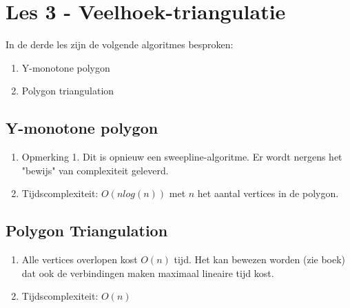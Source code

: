 \documentclass[12pt,a4paper]{article}
\begin{document}
	\section{Les 3 - Veelhoek-triangulatie}    
		In de derde les zijn de volgende algoritmes besproken:
		\begin{enumerate}
			\item Y-monotone polygon
			\item Polygon triangulation
		\end{enumerate}                
	
		\subsection{Y-monotone polygon}
			\begin{enumerate}
				\item Opmerking 1. Dit is opnieuw een sweepline-algoritme. Er wordt nergens het "bewijs" van complexiteit geleverd.
				\item Tijdscomplexiteit: $O(n log (n))$ met $n$ het aantal vertices in de polygon. 
			\end{enumerate}
		
		\subsection{Polygon Triangulation}
			\begin{enumerate}
				\item Alle vertices overlopen kost $O(n)$ tijd. Het kan bewezen worden (zie boek) dat ook de verbindingen maken maximaal lineaire tijd kost.
				\item Tijdscomplexiteit: $O(n)$
			\end{enumerate}
\end{document}

